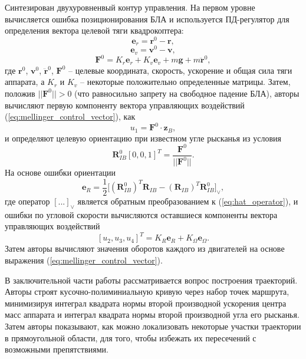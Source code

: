 Синтезирован двухуровненвый контур управления. На первом уровне вычисляется ошибка позиционирования БЛА и используется ПД-регулятор для определения вектора целевой тяги квадрокоптера:
\begin{equation} \label{eq:mellinger_pos_err}
\bm{e}_r = \bm{r}^{0} - \bm{r},
\end{equation}
\begin{equation} \label{eq:mellinger_vel_err}
\bm{e}_v = \bm{v}^{0} - \bm{v},
\end{equation}
\begin{equation} \label{eq:mellinger_pos_reg}
\bm{F}^0 = K_r \bm{e}_r + K_v \bm{e}_v + m \bm{g} + m \ddot{\bm{r}}^0,
\end{equation}
где $\bm{r}^{0}$, $\bm{v}^{0}$, $\ddot{\bm{r}}^{0}$, $\bm{F}^{0}$ -- целевые координата, скорость, ускорение и общая сила тяги аппарата, а $K_r$ и $K_v$ -- некоторые положительно определенные матрицы.
Затем, положив $ || \bm{F}^{0} || > 0$
(что равносильно запрету на свободное падение БЛА),
авторы вычисляют первую компоненту вектора управляющих воздействий (\ref{eq:mellinger_control_vector}),
как
\begin{equation} \label{eq:mellinger_u1}
u_1 = \bm{F}^{0} \cdot \bm{z}_B,
\end{equation}
и определяют целевую ориентацию при известном угле рысканья из условия
\begin{equation} \label{eq:mellinger_Rdes}
\bm{R}_{IB}^0 [0,0,1]^T = \frac{\bm{F}^{0}}{||\bm{F}^{0}||}.
\end{equation}
На основе ошибки ориентации
\begin{equation} \label{eq:mellinger_eR}
\bm{e}_R = \frac{1}{2}
\Big[
(\bm{R}_{IB}^0)^T 	\bm{R}_{IB} -
(\bm{R}_{IB})^T \bm{R}_{IB}^0
\Big]_\vee,
\end{equation}
где оператор $[...]_\vee$ является обратным преобразованием к (\ref{eq:hat_operator}), и ошибки по угловой скорости вычисляются оставшиеся компоненты вектора управляющих воздействий
\begin{equation} \label{eq:mellinger_att_reg}
[u_2, u_3, u_4]^T = K_R \bm{e}_R + K_{\Omega} \bm{e}_{\Omega}.
\end{equation}
Затем авторы вычисляют значения оборотов каждого из двигателей на основе выражения (\ref{eq:mellinger_control_vector}).
	
В заключительной части работы рассматривается вопрос построения траекторий. Авторы строят кусочно-полиминиальную кривую через набор точек маршрута, минимизируя интеграл квадрата нормы второй производной ускорения центра масс аппарата и интеграл квадрата нормы второй производной угла его рысканья. Затем  авторы показывают, как можно локализовать некоторые участки траектории в прямоугольной области, для того, чтобы избежать их пересечений с возможными препятствиями.

